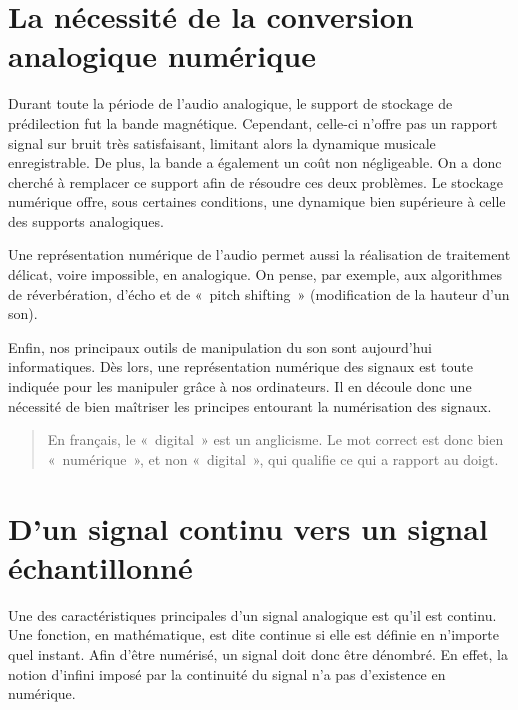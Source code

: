 \documentclass[
]{book}
\begin{document}
\hypertarget{la-nuxe9cessituxe9-de-la-conversion-analogique-numuxe9rique}{%
\section{La nécessité de la conversion analogique numérique}\label{la-nuxe9cessituxe9-de-la-conversion-analogique-numuxe9rique}}

Durant toute la période de l'audio analogique, le support de stockage de prédilection fut la bande magnétique. Cependant, celle-ci n'offre pas un rapport signal sur bruit très satisfaisant, limitant alors la dynamique musicale enregistrable. De plus, la bande a également un coût non négligeable. On a donc cherché à remplacer ce support afin de résoudre ces deux problèmes. Le stockage numérique offre, sous certaines conditions, une dynamique bien supérieure à celle des supports analogiques.

Une représentation numérique de l'audio permet aussi la réalisation de traitement délicat, voire impossible, en analogique. On pense, par exemple, aux algorithmes de réverbération, d'écho et de «~pitch shifting~» (modification de la hauteur d'un son).

Enfin, nos principaux outils de manipulation du son sont aujourd'hui informatiques. Dès lors, une représentation numérique des signaux est toute indiquée pour les manipuler grâce à nos ordinateurs. Il en découle donc une nécessité de bien maîtriser les principes entourant la numérisation des signaux.

\begin{quote}
En français, le «~digital~» est un anglicisme. Le mot correct est donc bien «~numérique~», et non «~digital~», qui qualifie ce qui a rapport au doigt.
\end{quote}

\hypertarget{dun-signal-continu-vers-un-signal-uxe9chantillonnuxe9}{%
\section{D'un signal continu vers un signal échantillonné}\label{dun-signal-continu-vers-un-signal-uxe9chantillonnuxe9}}

Une des caractéristiques principales d'un signal analogique est qu'il est continu. Une fonction, en mathématique, est dite continue si elle est définie en n'importe quel instant. Afin d'être numérisé, un signal doit donc être dénombré. En effet, la notion d'infini imposé par la continuité du signal n'a pas d'existence en numérique.
\end{document}
